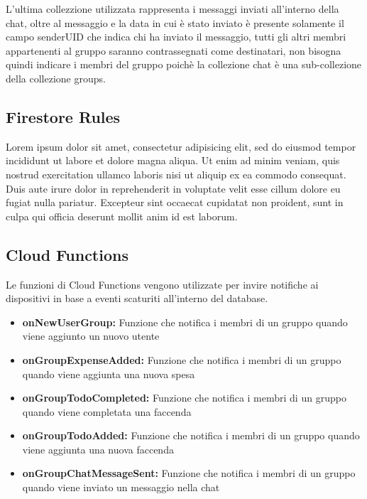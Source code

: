 L'ultima collezzione utilizzata rappresenta i messaggi inviati all'interno della chat, oltre al messaggio e la data in cui è stato inviato è presente solamente il campo senderUID che indica chi ha inviato il messaggio, tutti gli altri membri appartenenti al gruppo saranno contrassegnati come destinatari, non bisogna quindi indicare i membri del gruppo poichè la collezione chat è una sub-collezione della collezione groups.

\subsection{Firestore Rules}
Lorem ipsum dolor sit amet, consectetur adipisicing elit, sed do eiusmod tempor incididunt ut labore et dolore magna aliqua. Ut enim ad minim veniam, quis nostrud exercitation ullamco laboris nisi ut aliquip ex ea commodo consequat. Duis aute irure dolor in reprehenderit in voluptate velit esse cillum dolore eu fugiat nulla pariatur. Excepteur sint occaecat cupidatat non proident, sunt in culpa qui officia deserunt mollit anim id est laborum.

\newpage

\subsection{Cloud Functions}
Le funzioni di Cloud Functions vengono utilizzate per invire notifiche ai dispositivi in base a eventi scaturiti all'interno del database.\\

\begin{itemize}
    \item \textbf{onNewUserGroup:} Funzione che notifica i membri di un gruppo quando viene aggiunto un nuovo utente
    \item \textbf{onGroupExpenseAdded:} Funzione che notifica i membri di un gruppo quando viene aggiunta una nuova spesa
    \item \textbf{onGroupTodoCompleted:} Funzione che notifica i membri di un gruppo quando viene completata una faccenda
    \item \textbf{onGroupTodoAdded:} Funzione che notifica i membri di un gruppo quando viene aggiunta una nuova faccenda
    \item \textbf{onGroupChatMessageSent:} Funzione che notifica i membri di un gruppo quando viene inviato un messaggio nella chat
\end{itemize}



